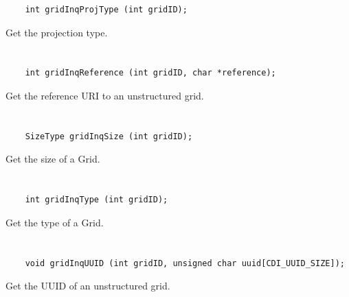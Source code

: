 \begin{verbatim}
    int gridInqProjType (int gridID);
\end{verbatim}

Get the projection type.


\section*{\tt {}}

\begin{verbatim}
    int gridInqReference (int gridID, char *reference);
\end{verbatim}

Get the reference URI to an unstructured grid.


\section*{\tt {}}

\begin{verbatim}
    SizeType gridInqSize (int gridID);
\end{verbatim}

Get the size of a Grid.


\section*{\tt {}}

\begin{verbatim}
    int gridInqType (int gridID);
\end{verbatim}

Get the type of a Grid.


\section*{\tt {}}

\begin{verbatim}
    void gridInqUUID (int gridID, unsigned char uuid[CDI_UUID_SIZE]);
\end{verbatim}

Get the UUID of an unstructured grid.


\section*{\tt {}}

